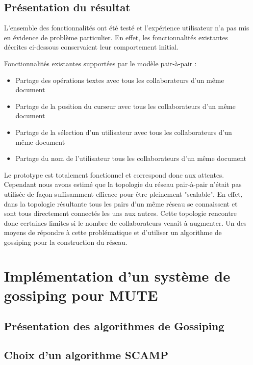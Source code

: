 \documentclass{tnreport}
\begin{document}
\subsection{Présentation du résultat}

L'ensemble des fonctionnalités ont été testé et l'expérience utilisateur n'a pas mis en évidence de problème particulier. En effet, les fonctionnalités existantes décrites ci-dessous conservaient leur comportement initial.

Fonctionnalités existantes supportées par le modèle pair-à-pair :
\begin{itemize}
  \item Partage des opérations textes avec tous les collaborateurs d'un même document
  \item Partage de la position du curseur avec tous les collaborateurs d'un même document
  \item Partage de la sélection d'un utilisateur avec tous les collaborateurs d'un même document
  \item Partage du nom de l'utilisateur tous les collaborateurs d'un même document\\
\end{itemize}

Le prototype est totalement fonctionnel et correspond donc aux attentes. Cependant nous avons estimé que la topologie du réseau pair-à-pair n'était pas utilisée de façon suffisamment efficace pour être pleinement "scalable". En effet, dans la topologie résultante tous les pairs d'un même réseau se connaissent et sont tous directement connectés les uns aux autres. Cette topologie rencontre donc certaines limites si le nombre de collaborateurs venait à augmenter. Un des moyens de répondre à cette problématique et d'utiliser un algorithme de gossiping pour la construction du réseau.

\section{Implémentation d'un système de gossiping pour MUTE}


\subsection{Présentation des algorithmes de Gossiping}

\subsection{Choix d'un algorithme SCAMP}
\end{document}
